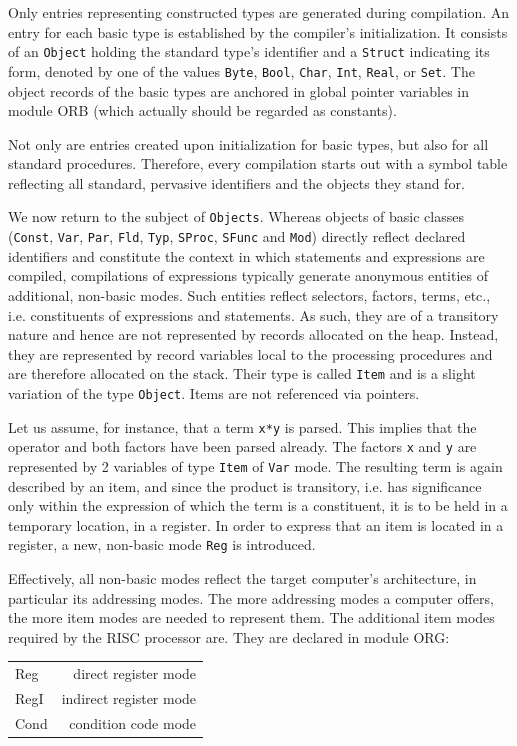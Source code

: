 Only entries representing constructed types are generated during compilation. An entry for each basic
type is established by the compiler's initialization. It consists of an \verb|Object| holding the
standard type's identifier and a \verb|Struct| indicating its form, denoted by one of the values
\verb|Byte|, \verb|Bool|, \verb|Char|, \verb|Int|, \verb|Real|, or \verb|Set|. The object records
of the basic types are anchored in global pointer variables in module ORB (which actually should be
regarded as constants).

Not only are entries created upon initialization for basic types, but also for all standard procedures.
Therefore, every compilation starts out with a symbol table reflecting all standard, pervasive
identifiers and the objects they stand for.

We now return to the subject of \verb|Objects|. Whereas objects of basic classes (\verb|Const|,
\verb|Var|, \verb|Par|, \verb|Fld|, \verb|Typ|, \verb|SProc|, \verb|SFunc| and \verb|Mod|) directly
reflect declared identifiers and constitute the context in which statements and expressions are
compiled, compilations of expressions typically generate anonymous entities of additional, non-basic
modes. Such entities reflect selectors, factors, terms, etc., i.e. constituents of expressions and
statements. As such, they are of a transitory nature and hence are not represented by records allocated
on the heap. Instead, they are represented by record variables local to the processing procedures and
are therefore allocated on the stack. Their type is called \verb|Item| and is a slight variation of the
type \verb|Object|. Items are not referenced via pointers.

Let us assume, for instance, that a term \verb|x*y| is parsed. This implies that the operator and both
factors have been parsed already. The factors \verb|x| and \verb|y| are represented by 2 variables of
type \verb|Item| of \verb|Var| mode. The resulting term is again described by an item, and since the
product is transitory, i.e. has significance only within the expression of which the term is a
constituent, it is to be held in a temporary location, in a register. In order to express that an item
is located in a register, a new, non-basic mode \verb|Reg| is introduced.

Effectively, all non-basic modes reflect the target computer's architecture, in particular its
addressing modes. The more addressing modes a computer offers, the more item modes are needed to
represent them. The additional item modes required by the RISC processor are. They are declared in
module ORG:
\begin{table}[h!]
  \centering
  \begin{tabular}{l r}
    Reg  &   direct register mode \\
    RegI & indirect register mode \\
    Cond &    condition code mode
  \end{tabular}
\end{table}

